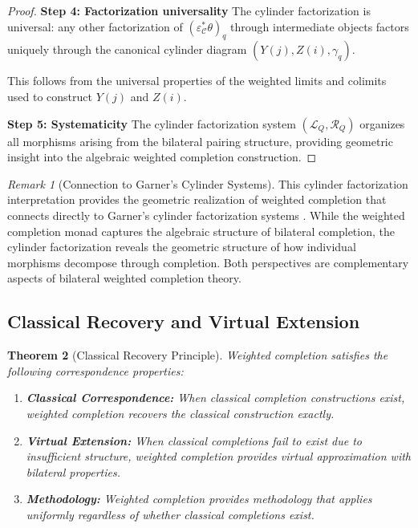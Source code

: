 \documentclass[11pt]{article}
\theoremstyle{plain}
\newtheorem{theorem}{Theorem}[section]
\theoremstyle{definition}
\theoremstyle{remark}
\newtheorem{remark}[theorem]{Remark}
\newcommand{\C}{\mathcal{C}}
\begin{document}
\begin{proof}
\textbf{Step 4: Factorization universality}
The cylinder factorization is universal: any other factorization of $(\varepsilon_\C^* \theta)_q$ through intermediate objects factors uniquely through the canonical cylinder diagram $(Y(j), Z(i), \gamma_q)$.

This follows from the universal properties of the weighted limits and colimits used to construct $Y(j)$ and $Z(i)$.

\textbf{Step 5: Systematicity}
The cylinder factorization system $(\mathcal{L}_Q, \mathcal{R}_Q)$ organizes all morphisms arising from the bilateral pairing structure, providing geometric insight into the algebraic weighted completion construction.
\end{proof}

\begin{remark}[Connection to Garner's Cylinder Systems]
This cylinder factorization interpretation provides the geometric realization of weighted completion that connects directly to Garner's cylinder factorization systems \cite{garner2018isbell}. While the weighted completion monad captures the algebraic structure of bilateral completion, the cylinder factorization reveals the geometric structure of how individual morphisms decompose through completion. Both perspectives are complementary aspects of bilateral weighted completion theory.
\end{remark}

\subsection{Classical Recovery and Virtual Extension}

\begin{theorem}[Classical Recovery Principle]\label{thm:classical-recovery}
Weighted completion satisfies the following correspondence properties:

\begin{enumerate}
\item \textbf{Classical Correspondence:} When classical completion constructions exist, weighted completion recovers the classical construction exactly.

\item \textbf{Virtual Extension:} When classical completions fail to exist due to insufficient structure, weighted completion provides virtual approximation with bilateral properties.

\item \textbf{Methodology:} Weighted completion provides methodology that applies uniformly regardless of whether classical completions exist.
\end{enumerate}
\end{theorem}
\end{document}

